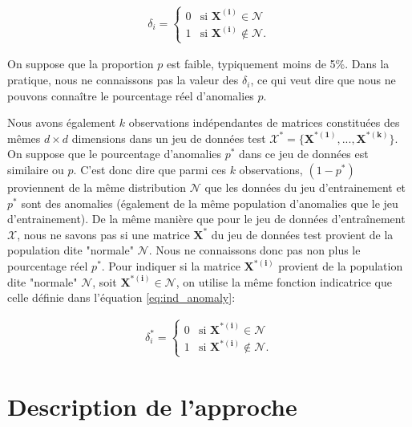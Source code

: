\begin{gather}  \label{eq:ind_anomaly}
\delta_{i}=
\begin{cases}
0 & \text{si $\boldsymbol{X^{(i)}}\in\mathcal{N}$} \\
1 & \text{si $\boldsymbol{X^{(i)}}\not\in\mathcal{N}$}.
\end{cases}
\end{gather}

On suppose que la proportion $p$ est faible, typiquement moins de 5\%. Dans la pratique, nous ne connaissons pas la valeur des $\delta_i$, ce qui veut dire que nous ne pouvons connaître le pourcentage réel d'anomalies $p$. 

Nous avons également $k$ observations indépendantes de matrices constituées des mêmes $d \times d$ dimensions dans un jeu de données test $\mathcal{X^*} = \{\boldsymbol{X^{*(1)}},...,\boldsymbol{X^{*(k)}}\}$. On suppose que le pourcentage d'anomalies $p^*$ dans ce jeu de données est similaire ou \DIFdelbegin {}\DIFdelend \DIFaddbegin {}\DIFaddend $p$. C'est donc dire que parmi ces $k$ observations, $(1-p^*)$ proviennent de la même distribution $\mathcal{N}$ que les données du jeu d'entrainement et \DIFaddbegin {}\DIFaddend $p^*$ sont des anomalies (également de la même population d'anomalies que le jeu d'entrainement). De la même manière que pour le jeu de données d'entraînement $\mathcal{X}$, nous ne savons pas si une matrice $\boldsymbol{X^{*}}$ du jeu de données test provient de la population dite "normale" $\mathcal{N}$. Nous ne connaissons donc pas non plus le pourcentage réel $p^*$. Pour indiquer si la matrice $\boldsymbol{X^{*(i)}}$ provient de la population dite "normale" $\mathcal{N}$, soit $ \boldsymbol{X^{*(i)}}\in\mathcal{N}$, on utilise la même fonction indicatrice que celle définie dans l'équation \ref{eq:ind_anomaly}:

\begin{gather}  \label{eq:ind_anomaly}
\delta^{*}_{i}=
\begin{cases}
0 & \text{si $\boldsymbol{X^{*(i)}}\in\mathcal{N}$} \\
1 & \text{si $\boldsymbol{X^{*(i)}}\not\in\mathcal{N}$}.
\end{cases}
\end{gather}


\section{Description de l'approche}


